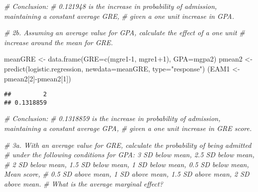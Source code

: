 \documentclass[
]{article}
\newenvironment{Shaded}{\begin{snugshade}}{\end{snugshade}}
\newcommand{\AttributeTok}[1]{\textcolor[rgb]{0.77,0.63,0.00}{#1}}
\newcommand{\CommentTok}[1]{\textcolor[rgb]{0.56,0.35,0.01}{\textit{#1}}}
\newcommand{\DecValTok}[1]{\textcolor[rgb]{0.00,0.00,0.81}{#1}}
\newcommand{\FunctionTok}[1]{\textcolor[rgb]{0.00,0.00,0.00}{#1}}
\newcommand{\NormalTok}[1]{#1}
\newcommand{\OtherTok}[1]{\textcolor[rgb]{0.56,0.35,0.01}{#1}}
\newcommand{\SpecialCharTok}[1]{\textcolor[rgb]{0.00,0.00,0.00}{#1}}
\newcommand{\StringTok}[1]{\textcolor[rgb]{0.31,0.60,0.02}{#1}}
\begin{document}
\begin{Shaded}
\begin{Highlighting}[]
\CommentTok{\# Conclusion:   }
\CommentTok{\# 0.121948 is the increase in probability of admission, maintaining a constant average GRE, }
\CommentTok{\# given a one unit increase in GPA.}



\CommentTok{\# 2b. Assuming an average value for GPA, calculate the effect of a one unit }
\CommentTok{\#     increase around the mean for GRE.  }
\end{Highlighting}
\end{Shaded}

\begin{Shaded}
\begin{Highlighting}[]
\NormalTok{meanGRE }\OtherTok{\textless{}{-}} \FunctionTok{data.frame}\NormalTok{(}\AttributeTok{GRE=}\FunctionTok{c}\NormalTok{(mgre1}\DecValTok{{-}1}\NormalTok{, mgre1}\SpecialCharTok{+}\DecValTok{1}\NormalTok{), }\AttributeTok{GPA=}\NormalTok{mgpa2)}
\NormalTok{pmean2 }\OtherTok{\textless{}{-}} \FunctionTok{predict}\NormalTok{(logistic.regression, }\AttributeTok{newdata=}\NormalTok{meanGRE, }\AttributeTok{type=}\StringTok{"response"}\NormalTok{)}
\NormalTok{(EAM1 }\OtherTok{\textless{}{-}}\NormalTok{ pmean2[}\DecValTok{2}\NormalTok{]}\SpecialCharTok{{-}}\NormalTok{pmean2[}\DecValTok{1}\NormalTok{])  }
\end{Highlighting}
\end{Shaded}

\begin{verbatim}
##         2 
## 0.1318859
\end{verbatim}

\begin{Shaded}
\begin{Highlighting}[]
\CommentTok{\# Conclusion: }
\CommentTok{\# 0.1318859 is the increase in probability of admission, maintaining a constant average GPA,   }
\CommentTok{\# given a one unit increase in GRE score.}



\CommentTok{\# 3a. With an average value for GRE, calculate the probability of being admitted }
\CommentTok{\#     under the following conditions for GPA: 3 SD below mean, 2.5 SD below mean, }
\CommentTok{\#     2 SD below mean, 1.5 SD below mean, 1 SD below mean, 0.5 SD below mean, Mean score, }
\CommentTok{\#     0.5 SD above mean, 1 SD above mean, 1.5 SD above mean, 2 SD above mean. }
\CommentTok{\#     What is the average marginal effect?   }
\end{Highlighting}
\end{Shaded}
\end{document}
